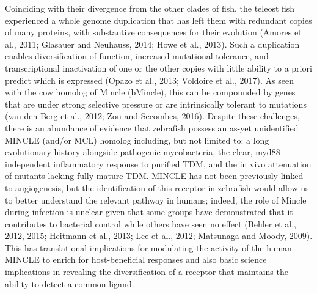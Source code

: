 
Coinciding with their divergence from the other clades of fish, the teleost fish experienced a whole genome duplication that has left them with redundant copies of many proteins, with substantive consequences for their evolution (Amores et al., 2011; Glasauer and Neuhauss, 2014; Howe et al., 2013). Such a duplication enables diversification of function, increased mutational tolerance, and transcriptional inactivation of one or the other copies with little ability to a priori predict which is expressed (Opazo et al., 2013; Voldoire et al., 2017). As seen with the cow homolog of Mincle (bMincle), this can be compounded by genes that are under strong selective pressure or are intrinsically tolerant to mutations (van den Berg et al., 2012; Zou and Secombes, 2016). Despite these challenges, there is an abundance of evidence that zebrafish possess an as-yet unidentified MINCLE (and/or MCL) homolog including, but not limited to: a long evolutionary history alongside pathogenic mycobacteria, the clear, myd88-independent inflammatory response to purified TDM, and the in vivo attenuation of mutants lacking fully mature TDM. MINCLE has not been previously linked to angiogenesis, but the identification of this receptor in zebrafish would allow us to better understand the relevant pathway in humans; indeed, the role of Mincle during infection is unclear given that some groups have demonstrated that it contributes to bacterial control while others have seen no effect (Behler et al., 2012, 2015; Heitmann et al., 2013; Lee et al., 2012; Matsunaga and Moody, 2009). This has translational implications for modulating the activity of the human MINCLE to enrich for host-beneficial responses and also basic science implications in revealing the diversification of a receptor that maintains the ability to detect a common ligand. 

